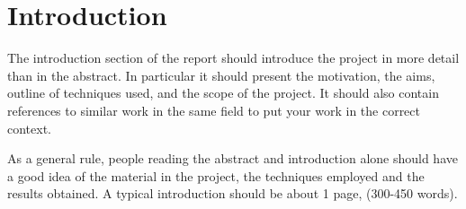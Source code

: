 \section{Introduction}

The introduction section of the report should introduce the project in
more detail than in the abstract. In particular it should present the
motivation, the aims, outline of techniques used, and the scope of the project. 
It should also contain references to similar work in the
same field to put your work in the correct context.

As a general rule, people reading the abstract and introduction alone
should have a good idea of the material in the project, the techniques
employed and the results obtained. A typical introduction should be
about 1 page, (300-450 words).
